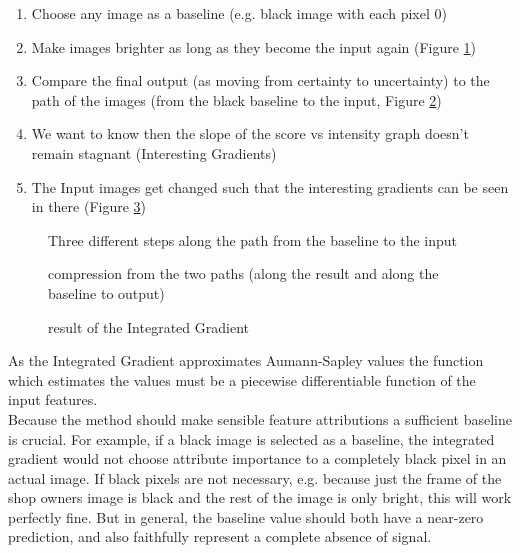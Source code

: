 \begin{enumerate}
	\item Choose any image as a baseline (e.g. black image with each pixel 0) 
	\item Make images brighter as long as they become the input again  (Figure \ref{fig:step2})
	\item Compare the final output (as moving from certainty to uncertainty) to the path of the images (from the black baseline to the input, Figure \ref{fig:step3}) 
	\item We want to know then the slope of the score vs intensity graph doesn't remain stagnant (Interesting Gradients)
	\item The Input images get changed such that the interesting gradients can be seen in there (Figure \ref{fig:step5})
\end{enumerate}

\begin{figure}[!htp]
	\centering
	\caption{Three different steps along the path from the baseline to the input}
	\label{fig:step2}
\end{figure}

\begin{figure}[!htp]
	\centering
	\caption{compression from the two paths (along the result and along the baseline to output)}
	\label{fig:step3}
\end{figure}

\begin{figure}[!htp]
	\centering
	\caption{result of the Integrated Gradient}
	\label{fig:step5}
\end{figure}

As the Integrated Gradient approximates Aumann-Sapley values the function which estimates the values must be a piecewise differentiable function of the input features.\\

Because the method should make sensible feature attributions a sufficient baseline is crucial. For example, if a black image is selected as a baseline, the integrated gradient would not choose attribute importance to a completely black pixel in an actual image. If black pixels are not necessary, e.g. because just the frame of the shop owners image is black and the rest of the image is only bright, this will work perfectly fine. But in general, the baseline value should both have a near-zero prediction, and also faithfully represent a complete absence of signal.\\ 

